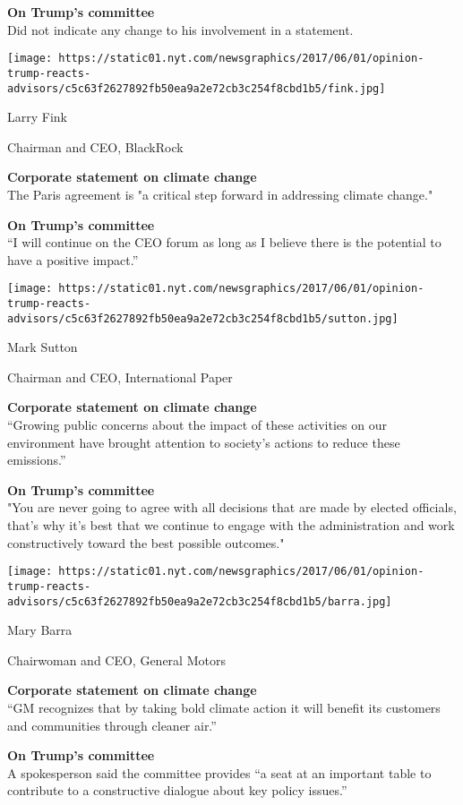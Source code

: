 \textbf{On Trump's committee}\\
Did not indicate any change to his involvement in a statement.

\texttt{[image: https://static01.nyt.com/newsgraphics/2017/06/01/opinion-trump-reacts-advisors/c5c63f2627892fb50ea9a2e72cb3c254f8cbd1b5/fink.jpg]}

Larry Fink

Chairman and CEO, BlackRock

\textbf{Corporate statement on climate change}\\
The Paris agreement is "a critical step forward in addressing climate
change."

\textbf{On Trump's committee}\\
``I will continue on the CEO forum as long as I believe there is the
potential to have a positive impact.''

\texttt{[image: https://static01.nyt.com/newsgraphics/2017/06/01/opinion-trump-reacts-advisors/c5c63f2627892fb50ea9a2e72cb3c254f8cbd1b5/sutton.jpg]}

Mark Sutton

Chairman and CEO, International Paper

\textbf{Corporate statement on climate change}\\
``Growing public concerns about the impact of these activities on our
environment have brought attention to society's actions to reduce these
emissions.''

\textbf{On Trump's committee}\\
"You are never going to agree with all decisions that are made by
elected officials, that's why it's best that we continue to engage with
the administration and work constructively toward the best possible
outcomes."

\texttt{[image: https://static01.nyt.com/newsgraphics/2017/06/01/opinion-trump-reacts-advisors/c5c63f2627892fb50ea9a2e72cb3c254f8cbd1b5/barra.jpg]}

Mary Barra

Chairwoman and CEO, General Motors

\textbf{Corporate statement on climate change}\\
``GM recognizes that by taking bold climate action it will benefit its
customers and communities through cleaner air.''

\textbf{On Trump's committee}\\
A spokesperson said the committee provides ``a seat at an important
table to contribute to a constructive dialogue about key policy
issues.''

